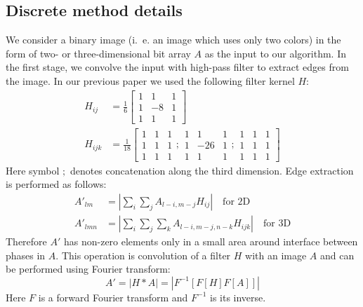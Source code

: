 \documentclass[preprint]{elsarticle}
\begin{document}
\subsection{Discrete method details}
We consider a binary image (i.~e. an image which uses only two colors) in the
form of two- or three-dimensional bit array $A$ as the input to our
algorithm. In the first stage, we convolve the input with high-pass filter to
extract edges from the image. In our previous paper \cite{Samarin} we used the
following filter kernel $H$:
\begin{equation}
  \begin{aligned}
    H_{ij} &= \frac{1}{6} \left[
      \begin{array}{ccc}
        1 & 1 & 1 \\
        1 & -8 & 1 \\
        1 & 1 & 1
      \end{array}
      \right] \\
    H_{ijk} &= \frac{1}{18} \left[
      \begin{array}{ccc}
        1 & 1 & 1 \\
        1 & 1 & 1 \\
        1 & 1 & 1
      \end{array} ;
      \begin{array}{ccc}
        1 & 1 & 1 \\
        1 & -26 & 1 \\
        1 & 1 & 1
      \end{array} ;
      \begin{array}{ccc}
        1 & 1 & 1 \\
        1 & 1 & 1 \\
        1 & 1 & 1
      \end{array}
      \right]
  \end{aligned}
  \label{eq:filter-3x3}
\end{equation}
Here symbol $;$ denotes concatenation along the third dimension. Edge extraction
is performed as follows:
\begin{equation}
  \begin{aligned}
    A'_{lm}  &= \left| \sum_i\sum_j A_{l-i, m-j}H_{ij} \right| \quad \text{for 2D} \\
    A'_{lmn} &= \left| \sum_i\sum_j\sum_k A_{l-i, m-j, n-k}H_{ijk} \right| \quad \text{for 3D}
  \end{aligned}
\end{equation}
Therefore $A'$ has non-zero elements only in a small area around interface
between phases in $A$. This operation is convolution of a filter $H$ with an
image $A$ and can be performed using Fourier transform:
\begin{equation}
  A' = |H*A| = |F^{-1}[F[H] F[A]]|
\end{equation}
Here $F$ is a forward Fourier transform and $F^{-1}$ is its inverse.
\end{document}
